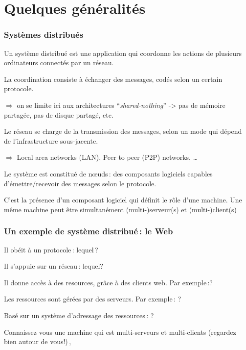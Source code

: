 
\section{Quelques généralités}


\begin{frame}
\frametitle{Systèmes distribués}

Un \alert{système distribué} est une application qui coordonne les
actions de plusieurs ordinateurs connectés par un réseau.

  
  \vfill
  La coordination consiste à échanger des \alert{messages}, codés selon un certain
    \alert{protocole}.
      
   $\Rightarrow$ on se limite ici aux architectures ``\textit{shared-nothing}''  -> 
       pas de mémoire partagée, pas de disque partagé, etc.
 
   
   \vfill 
   
   Le réseau se charge de la transmission des messages, selon un mode qui dépend
      de l'infrastructure sous-jacente.
    
   $\Rightarrow$ Local area networks (LAN), Peer to peer (P2P) networks, \ldots
    
    \vfill
    
    Le système est constitué de \alert{n{\oe}uds}\,: des composants logiciels
      capables d'émettre/recevoir des messages selon le protocole.
      
\begin{remark}
C'est la présence d'un \alert{composant logiciel} qui définit le rôle d'une machine.
Une même machine peut être simultanément (multi-)serveur(s) et (multi-)client(s)
\end{remark}
\end{frame}

\begin{frame}
\frametitle{Un exemple de système distribué\,: le Web}

Il obéit à un protocole\,: lequel\,?

\vfill

Il s'appuie sur un réseau\,: lequel?

\vfill

Il donne accès à des resources, grâce à des \alert{clients web}. Par exemple\,:?

\vfill

Les ressources sont gérées par des \alert{serveurs}. Par exemple\,: ?

\vfill

Basé sur un système d'adressage des ressources\,: ?

\vfill

Connaissez vous une machine qui  est multi-serveurs et multi-clients
(regardez bien autour de vous!)\,,
\end{frame}



